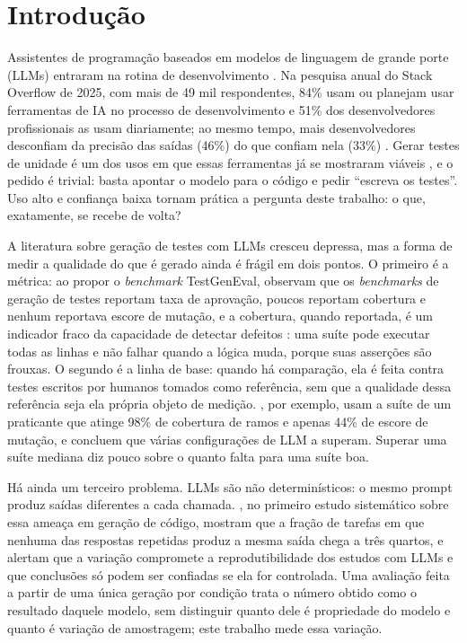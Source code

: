\chapter{Introdução}
\label{cap:introducao}

Assistentes de programação baseados em modelos de linguagem de grande porte (LLMs) entraram na rotina de desenvolvimento \cite{liang2024}. Na pesquisa anual do Stack Overflow de 2025, com mais de 49 mil respondentes, 84\% usam ou planejam usar ferramentas de IA no processo de desenvolvimento e 51\% dos desenvolvedores profissionais as usam diariamente; ao mesmo tempo, mais desenvolvedores desconfiam da precisão das saídas (46\%) do que confiam nela (33\%) \cite{stackoverflow2025}. Gerar testes de unidade é um dos usos em que essas ferramentas já se mostraram viáveis \cite{schafer2024,yuan2024}, e o pedido é trivial: basta apontar o modelo para o código e pedir ``escreva os testes''. Uso alto e confiança baixa tornam prática a pergunta deste trabalho: o que, exatamente, se recebe de volta?

 A literatura sobre geração de testes com LLMs cresceu depressa, mas a forma de medir a qualidade do que é gerado ainda é frágil em dois pontos. O primeiro é a métrica: ao propor o \textit{benchmark} TestGenEval,  observam que os \textit{benchmarks} de geração de testes reportam taxa de aprovação, poucos reportam cobertura e nenhum reportava escore de mutação, e a cobertura, quando reportada, é um indicador fraco da capacidade de detectar defeitos \cite{inozemtseva2014}: uma suíte pode executar todas as linhas e não falhar quando a lógica muda, porque suas asserções são frouxas. O segundo é a linha de base: quando há comparação, ela é feita contra testes escritos por humanos tomados como referência, sem que a qualidade dessa referência seja ela própria objeto de medição. , por exemplo, usam a suíte de um praticante que atinge 98\% de cobertura de ramos e apenas 44\% de escore de mutação, e concluem que várias configurações de LLM a superam. Superar uma suíte mediana diz pouco sobre o quanto falta para uma suíte boa.

Há ainda um terceiro problema. LLMs são não determinísticos: o mesmo prompt produz saídas diferentes a cada chamada. , no primeiro estudo sistemático sobre essa ameaça em geração de código, mostram que a fração de tarefas em que nenhuma das respostas repetidas produz a mesma saída chega a três quartos, e alertam que a variação compromete a reprodutibilidade dos estudos com LLMs e que conclusões só podem ser confiadas se ela for controlada. Uma avaliação feita a partir de uma única geração por condição trata o número obtido como o resultado daquele modelo, sem distinguir quanto dele é propriedade do modelo e quanto é variação de amostragem; este trabalho mede essa variação.


